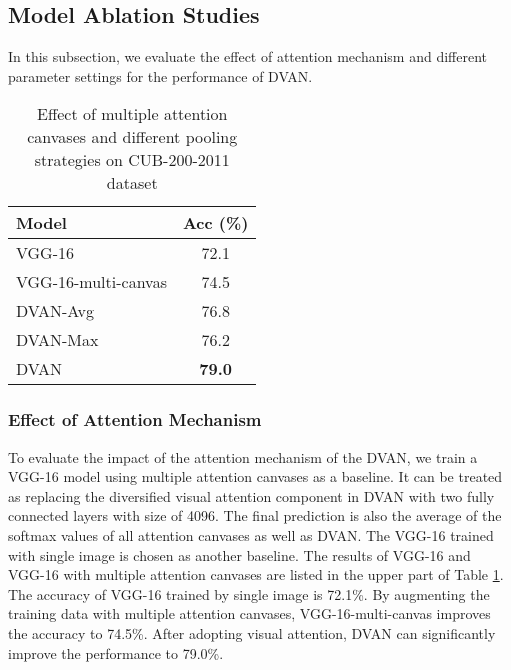 \documentclass[journal]{IEEEtran}
\begin{document}
\subsection{Model Ablation Studies}
In this subsection, we evaluate the effect of attention mechanism and different parameter settings for the performance of DVAN.

\begin{table}[!bt]
  \centering
  \vspace{-0.1in}
  \caption{Effect of multiple attention canvases and different pooling strategies on CUB-200-2011 dataset}
  \label{tab:comparison_pool_cub}
  \begin{tabular}{lc}
    \hline\hline
    Model                & Acc (\%)\\
    \hline
    VGG-16               & 72.1  \\
    VGG-16-multi-canvas & 74.5  \\
    \hline
    DVAN-Avg  & 76.8  \\
    DVAN-Max      & 76.2  \\
    DVAN       & \textbf{79.0}\\
    \hline\hline
  \end{tabular}
  \vspace{-0.2in}
\end{table}

\subsubsection{Effect of Attention Mechanism}
To evaluate the impact of the attention mechanism of the DVAN, we train a VGG-16 model using multiple attention canvases as a baseline. It can be treated as replacing the diversified visual attention component in DVAN with two fully connected layers with size of 4096. The final prediction is also the average of the softmax values of all attention canvases as well as DVAN. The VGG-16 trained with single image is chosen as another baseline. The results of VGG-16 and VGG-16 with multiple attention canvases are listed in the upper part of Table \ref{tab:comparison_pool_cub}. The accuracy of VGG-16 trained by single image is 72.1\%. By augmenting the training data with multiple attention canvases, VGG-16-multi-canvas improves the accuracy to 74.5\%. After adopting visual attention, DVAN can significantly improve the performance to 79.0\%.
\end{document}
